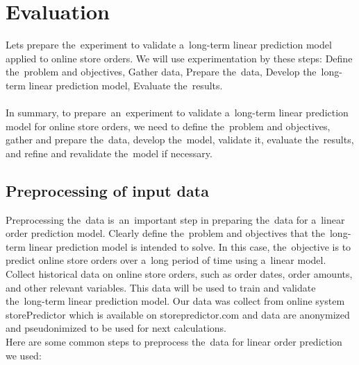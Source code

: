 
\chapter{Evaluation} \label{evaluation}
Lets prepare the~experiment to validate a~long-term linear prediction model applied to
online store orders. We will use experimentation by these steps: Define the~problem and objectives,
Gather data, Prepare the~data, Develop the~long-term linear prediction model, Evaluate the~results.\\
\\
In summary, to prepare~an~experiment to validate a~long-term linear prediction model for online store orders, we need to
define the~problem and objectives, gather and prepare the~data, develop the~model, validate it, evaluate the~results,
and refine and revalidate the~model if necessary.

\section{Preprocessing of input data}\label{subsec:preprocessing}
Preprocessing the~data is~an~important step in preparing the~data for a~linear order prediction model.
Clearly define the~problem and objectives that the~long-term linear prediction model is intended
to solve. In this case, the~objective is to predict online store orders over a~long period of
time using a~linear model. Collect historical data on online store orders, such as order dates,
order amounts, and other relevant variables. This data will be used to train and validate
the~long-term linear prediction model. Our data was collect from online system storePredictor
which is available on storepredictor.com and data are anonymized and pseudonimized to be used
for next calculations.\\
Here are some common steps to preprocess the~data for linear order prediction we used:

